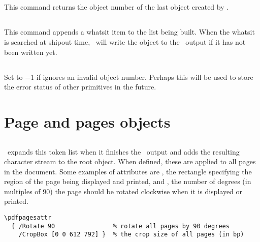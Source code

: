 \documentclass{pdftexmanual}
\begin{document}
\subsection{}

This command returns the object number of the last object created by \type
{\pdfobj}.

\subsection{}

This command appends a whatsit item to the list being built. When the
whatsit is searched at shipout time, \PDFTEX\ will write the object
 to the \PDF\ output if it has not been written
yet.

\subsection{}

Set to $-1$ if  ignores an invalid object number.  Perhaps
this will be used to store the error status of other primitives in the
future.

\section{Page and pages objects}

\subsection{}

\PDFTEX\ expands this token list when it finishes the \PDF\ output and
adds the resulting character stream to the root 
object. When defined, these are applied to all pages in the
document. Some examples of attributes are , the rectangle
specifying the region of the page being displayed and printed, and
, the number of degrees (in multiples of 90) the page
should be rotated clockwise when it is displayed or printed.

\begin{verbatim}
\pdfpagesattr
  { /Rotate 90                % rotate all pages by 90 degrees
    /CropBox [0 0 612 792] }  % the crop size of all pages (in bp)
\end{verbatim}
\end{document}
